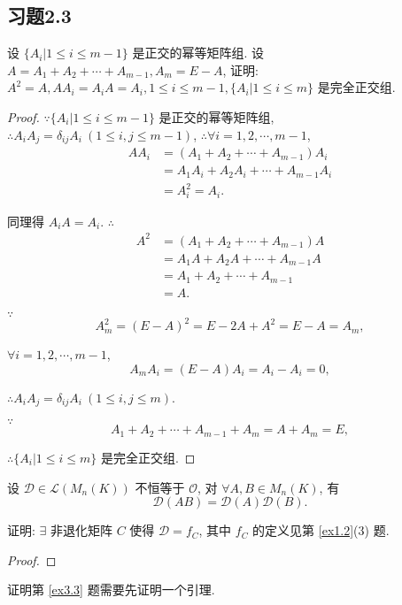 \documentclass[color=black,device=normal,lang=cn,mode=geye]{elegantnote}
\begin{document}
\subsection{习题2.3}
\begin{exercise}%
    设 $\{A_i|1\leq i\leq m-1\}$ 是正交的幂等矩阵组. 设 $A=A_1+A_2+\cdots+A_{m-1},A_m=E-A$, 证明: $A^2=A,AA_i=A_iA=A_i,1\leq i\leq m-1,\{A_i|1\leq i\leq m\}$ 是完全正交组.
\end{exercise}
\begin{proof}
    $\because\{A_i|1\leq i\leq m-1\}$ 是正交的幂等矩阵组, $\therefore A_iA_j=\delta_{ij}A_i\ (1\leq i,j\leq m-1)$, $\therefore\forall i=1,2,\cdots,m-1$,
    \begin{align*}
        AA_i & =(A_1+A_2+\cdots+A_{m-1})A_i \\
        & =A_1A_i+A_2A_i+\cdots+A_{m-1}A_i \\
        & =A_i^2=A_i.
    \end{align*}

    同理得 $A_iA=A_i$. $\therefore$
    \begin{align*}
        A^2 & =(A_1+A_2+\cdots+A_{m-1})A \\
        & =A_1A+A_2A+\cdots+A_{m-1}A \\
        & =A_1+A_2+\cdots+A_{m-1} \\
        & =A.
    \end{align*}

    $\because$
    \[A_m^2=(E-A)^2=E-2A+A^2=E-A=A_m,\]

    $\forall i=1,2,\cdots,m-1$,
    \[A_mA_i=(E-A)A_i=A_i-A_i=0,\]

    $\therefore A_iA_j=\delta_{ij}A_i\ (1\leq i,j\leq m)$.
    
    $\because$
    \[A_1+A_2+\cdots+A_{m-1}+A_m=A+A_m=E,\]

    $\therefore\{A_i|1\leq i\leq m\}$ 是完全正交组.
\end{proof}
\begin{exercise}%
    设 $\mathcal{D}\in\mathcal{L}(M_n(K))$ 不恒等于 $\mathcal{O}$, 对 $\forall A,B\in M_n(K)$, 有
    \[\mathcal{D}(AB)=\mathcal{D}(A)\mathcal{D}(B).\]

    证明: $\exists$ 非退化矩阵 $C$ 使得 $\mathcal{D}=f_C$, 其中 $f_C$ 的定义见第 \ref{ex1.2}(3) 题.
\end{exercise}
\begin{proof}
     
\end{proof}
证明第 \ref{ex3.3} 题需要先证明一个引理.
\end{document}
